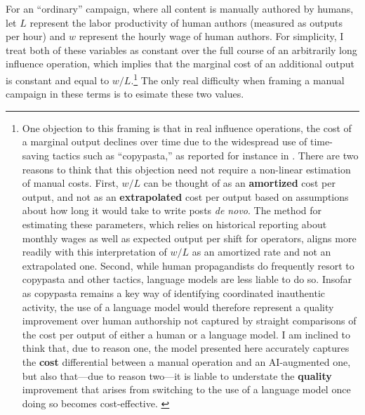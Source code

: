 \documentclass{article}
\begin{document}
For an ``ordinary'' campaign, where all content is manually authored by humans, let $L$ represent the labor productivity of human authors (measured as outputs per hour) and $w$ represent the hourly wage of human authors. For simplicity, I treat both of these variables as constant over the full course of an arbitrarily long influence operation, which implies that the marginal cost of an additional output is constant and equal to $w/L$.\footnote{One objection to this framing is that in real influence operations, the cost of a marginal output declines over time due to the widespread use of time-saving tactics such as ``copypasta,'' as reported for instance in \cite{siochina}. There are two reasons to think that this objection need not require a non-linear estimation of manual costs. First, $w/L$ can be thought of as an \textbf{amortized} cost per output, and not as an \textbf{extrapolated} cost per output based on assumptions about how long it would take to write posts \textit{de novo}. The method for estimating these parameters, which relies on historical reporting about monthly wages as well as expected output per shift for operators, aligns more readily with this interpretation of $w/L$ as an amortized rate and not an extrapolated one. Second, while human propagandists do frequently resort to copypasta and other tactics, language models are less liable to do so. Insofar as copypasta remains a key way of identifying coordinated inauthentic activity, the use of a language model would therefore represent a quality improvement over human authorship not captured by straight comparisons of the cost per output of either a human or a language model. I am inclined to think that, due to reason one, the model presented here accurately captures the \textbf{cost} differential between a manual operation and an AI-augmented one, but also that—due to reason two—it is liable to understate the \textbf{quality} improvement that arises from switching to the use of a language model once doing so becomes cost-effective. \label{fnquality}} The only real difficulty when framing a manual campaign in these terms is to esimate these two values.
\end{document}
